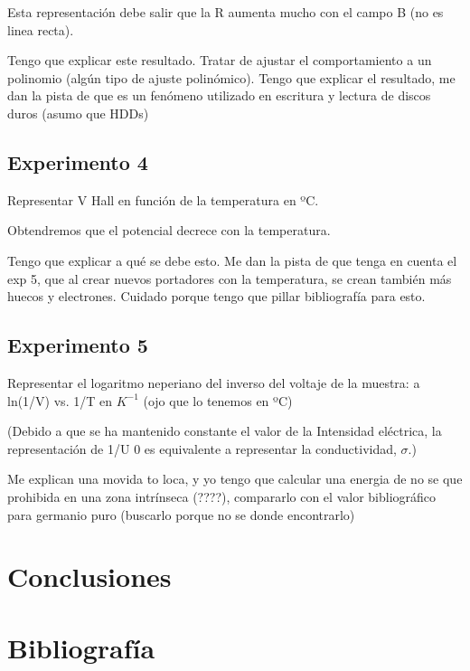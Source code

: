 Esta representación debe salir que la R aumenta mucho con el campo B (no es linea recta). 

Tengo que explicar este resultado. Tratar de ajustar el comportamiento a un polinomio (algún tipo de ajuste polinómico). Tengo que explicar el resultado, me dan la pista de que es un fenómeno utilizado en escritura y lectura de discos duros (asumo que HDDs)



\subsection{Experimento 4}

Representar V Hall en función de la temperatura en ºC.

Obtendremos que el potencial decrece con la temperatura. 

Tengo que explicar a qué se debe esto. Me dan la pista de que tenga en cuenta el exp 5, que al crear nuevos portadores con la temperatura, se crean también más huecos y electrones. Cuidado porque tengo que pillar bibliografía para esto.


\subsection{Experimento 5}

Representar el logaritmo neperiano del inverso del voltaje de la muestra: a ln(1/V) vs. 1/T en $K^{-1}$ (ojo que lo tenemos en ºC)

(Debido a que se ha mantenido constante el valor de la Intensidad eléctrica, la representación de
1/U 0 es equivalente a representar la conductividad, $\sigma$.)


Me explican una movida to loca, y yo tengo que calcular una energia de no se que prohibida en una zona intrínseca (????), compararlo con el valor bibliográfico para germanio puro (buscarlo porque no se donde encontrarlo)


\section{Conclusiones}





\section{Bibliografía}











